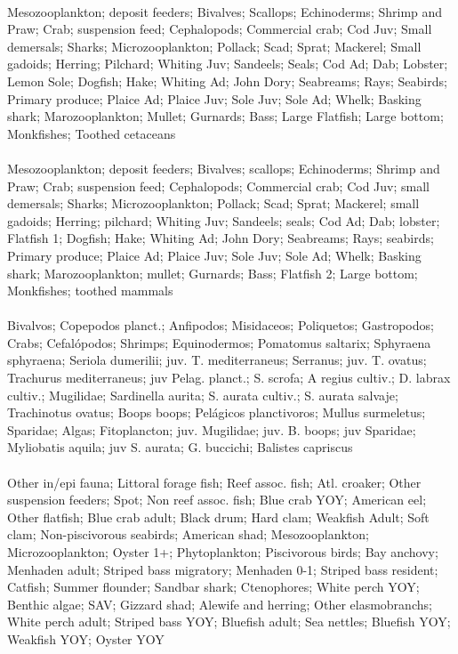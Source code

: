 \fullhline
\hline
{} \\
\hline
Mesozooplankton; deposit feeders; Bivalves; Scallops; Echinoderms; Shrimp and Praw; Crab; suspension feed; Cephalopods; Commercial crab; Cod Juv; Small demersals; Sharks; Microzooplankton; Pollack; Scad; Sprat; Mackerel; Small gadoids; Herring; Pilchard; Whiting Juv; Sandeels; Seals; Cod Ad; Dab; Lobster; Lemon Sole; Dogfish; Hake; Whiting Ad; John Dory; Seabreams; Rays; Seabirds; Primary produce; Plaice Ad; Plaice Juv; Sole Juv; Sole Ad; Whelk; Basking shark; Marozooplankton; Mullet; Gurnards; Bass; Large Flatfish; Large bottom; Monkfishes; Toothed cetaceans\\
\fullhline
\hline
{} \\
\hline
Mesozooplankton; deposit feeders; Bivalves; scallops; Echinoderms; Shrimp and Praw; Crab; suspension feed; Cephalopods; Commercial crab; Cod Juv; small demersals; Sharks; Microzooplankton; Pollack; Scad; Sprat; Mackerel; small gadoids; Herring; pilchard; Whiting Juv; Sandeels; seals; Cod Ad; Dab; lobster; Flatfish 1; Dogfish; Hake; Whiting Ad; John Dory; Seabreams; Rays; seabirds; Primary produce; Plaice Ad; Plaice Juv; Sole Juv; Sole Ad; Whelk; Basking shark; Marozooplankton; mullet; Gurnards; Bass; Flatfish 2; Large bottom; Monkfishes; toothed mammals\\
\fullhline
\hline
{} \\
\hline
Bivalvos; Copepodos planct.; Anfipodos; Misidaceos; Poliquetos; Gastropodos; Crabs; Cefalópodos; Shrimps; Equinodermos; Pomatomus saltarix; Sphyraena sphyraena; Seriola dumerilii; juv. T. mediterraneus; Serranus; juv. T. ovatus; Trachurus mediterraneus; juv Pelag. planct.; S. scrofa; A regius cultiv.; D. labrax cultiv.; Mugilidae; Sardinella aurita; S. aurata cultiv.; S. aurata salvaje; Trachinotus ovatus; Boops boops; Pelágicos planctivoros; Mullus surmeletus; Sparidae; Algas; Fitoplancton; juv. Mugilidae; juv. B. boops; juv Sparidae; Myliobatis aquila; juv S. aurata; G. buccichi; Balistes capriscus\\
\fullhline
\hline
{} \\
\hline
Other in/epi fauna; Littoral forage fish; Reef assoc. fish; Atl. croaker; Other suspension feeders; Spot; Non reef assoc. fish; Blue crab YOY; American eel; Other flatfish; Blue crab adult; Black drum; Hard clam; Weakfish Adult; Soft clam; Non-piscivorous seabirds; American shad; Mesozooplankton; Microzooplankton; Oyster 1+; Phytoplankton; Piscivorous birds; Bay anchovy; Menhaden adult; Striped bass migratory; Menhaden 0-1; Striped bass resident; Catfish; Summer flounder; Sandbar shark; Ctenophores; White perch YOY; Benthic algae; SAV; Gizzard shad; Alewife and herring; Other elasmobranchs; White perch adult; Striped bass YOY; Bluefish adult; Sea nettles; Bluefish YOY; Weakfish YOY; Oyster YOY\\
